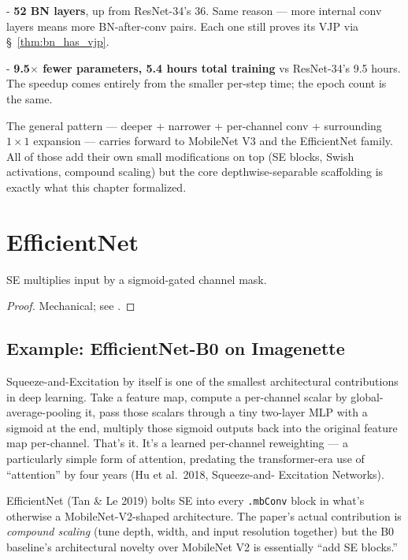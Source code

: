 - \textbf{52 BN layers}, up from ResNet-34's 36. Same reason ---
  more internal conv layers means more BN-after-conv
  pairs. Each one still proves its VJP via
  \S~\ref{thm:bn_has_vjp}.

- \textbf{9.5$\times$ fewer parameters, 5.4 hours total
  training} vs ResNet-34's 9.5 hours. The speedup comes entirely
  from the smaller per-step time; the epoch count is the same.

The general pattern ---  deeper + narrower + per-channel conv +
surrounding $1 \times 1$ expansion --- carries forward to MobileNet
V3 and the EfficientNet family. All of those add their own small
modifications on top (SE blocks, Swish activations, compound scaling)
but the core depthwise-separable scaffolding is exactly what this
chapter formalized.

\chapter{EfficientNet}
\label{chap:se}

\begin{theorem}
  \label{thm:seBlock_has_vjp}
  \leanok
  SE multiplies input by a sigmoid-gated channel mask.
\end{theorem}

\begin{proof}
\leanok
Mechanical; see .
\end{proof}

\section{Example: EfficientNet-B0 on Imagenette}
\label{sec:se_efficientnet_example}

Squeeze-and-Excitation by itself is one of the smallest architectural
contributions in deep learning. Take a feature map, compute a
per-channel scalar by global-average-pooling it, pass those scalars
through a tiny two-layer MLP with a sigmoid at the end, multiply
those sigmoid outputs back into the original feature map
per-channel. That's it. It's a learned per-channel reweighting --- a
particularly simple form of attention, predating the transformer-era
use of ``attention'' by four years (Hu et al.\ 2018, Squeeze-and-
Excitation Networks).

EfficientNet (Tan \& Le 2019) bolts SE into every
\texttt{.mbConv} block in what's otherwise a MobileNet-V2-shaped
architecture. The paper's actual contribution is \emph{compound
scaling} (tune depth, width, and input resolution together) but
the B0 baseline's architectural novelty over MobileNet V2 is
essentially ``add SE blocks.''

